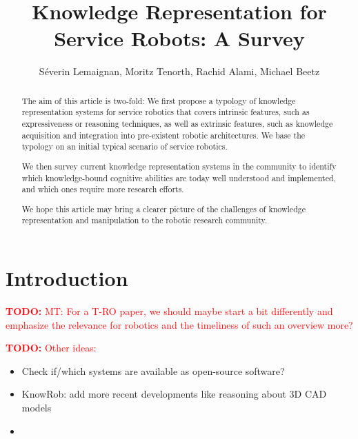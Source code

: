 \documentclass[journal]{IEEEtran}
\title{Knowledge Representation for Service Robots: A Survey}
\author{Séverin Lemaignan, Moritz Tenorth, Rachid Alami, Michael Beetz}
\newcommand{\todo}[1]{\textcolor{red}{\textbf{TODO:} #1}}
\begin{document}
\maketitle


\begin{abstract}

The aim of this article is two-fold: We first propose a typology of
knowledge representation systems for service robotics that covers intrinsic
features, such as expressiveness or reasoning techniques, as well as extrinsic
features, such as knowledge acquisition and integration into pre-existent 
robotic architectures. We base the typology on an initial typical scenario of 
service robotics.

We then survey current knowledge representation systems in the community to
identify which knowledge-bound cognitive abilities are today well understood
and implemented, and which ones require more research efforts.

We hope this article may bring a clearer picture of the challenges of knowledge
representation and manipulation to the robotic research community.

\end{abstract}



\section{Introduction}
\label{sect|intro}

\todo{MT: For a T-RO paper, we should maybe start a bit differently and 
      emphasize the relevance for robotics and the timeliness of such an 
      overview more?}

\todo{Other ideas:}

\begin{itemize}
  \item Check if/which systems are available as open-source software?
  \item KnowRob: add more recent developments like reasoning about 3D CAD models
  \item 
\end{itemize}



\end{document}
